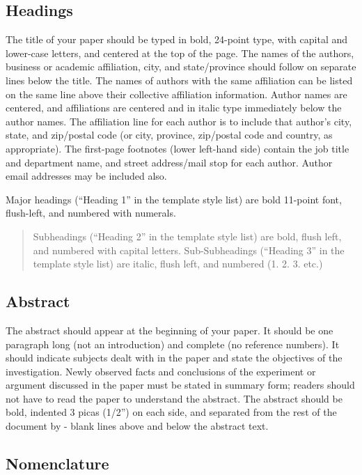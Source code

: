 \documentclass[
]{article}
\begin{document}
\subsection{Headings}\label{headings}

The title of your paper should be typed in bold, 24-point type, with
capital and lower-case letters, and centered at the top of the page. The
names of the authors, business or academic affiliation, city, and
state/province should follow on separate lines below the title. The
names of authors with the same affiliation can be listed on the same
line above their collective affiliation information. Author names are
centered, and affiliations are centered and in italic type immediately
below the author names. The affiliation line for each author is to
include that author's city, state, and zip/postal code (or city,
province, zip/postal code and country, as appropriate). The first-page
footnotes (lower left-hand side) contain the job title and department
name, and street address/mail stop for each author. Author email
addresses may be included also.

Major headings (``Heading 1'' in the template style list) are bold
11-point font, flush-left, and numbered with numerals.

\begin{quote}
Subheadings (``Heading 2'' in the template style list) are bold, flush
left, and numbered with capital letters. Sub-Subheadings (``Heading 3''
in the template style list) are italic, flush left, and numbered (1. 2.
3. etc.)
\end{quote}

\subsection{Abstract}\label{abstract}

The abstract should appear at the beginning of your paper. It should be
one paragraph long (not an introduction) and complete (no reference
numbers). It should indicate subjects dealt with in the paper and state
the objectives of the investigation. Newly observed facts and
conclusions of the experiment or argument discussed in the paper must be
stated in summary form; readers should not have to read the paper to
understand the abstract. The abstract should be bold, indented 3 picas
(1/2'') on each side, and separated from the rest of the document by -
blank lines above and below the abstract text.

\subsection{Nomenclature}\label{nomenclature}
\end{document}
